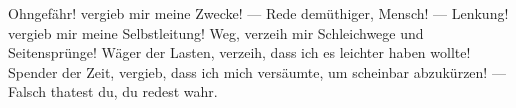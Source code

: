 Ohngefähr! vergieb mir meine Zwecke! — Rede demüthiger, Mensch! — Lenkung! vergieb mir meine Selbstleitung! Weg, verzeih mir Schleichwege und Seitensprünge! Wäger der Lasten, verzeih, dass ich es leichter haben wollte! Spender der Zeit, vergieb, dass ich mich versäumte, um scheinbar abzukürzen! — Falsch thatest du, du redest wahr.
\par

